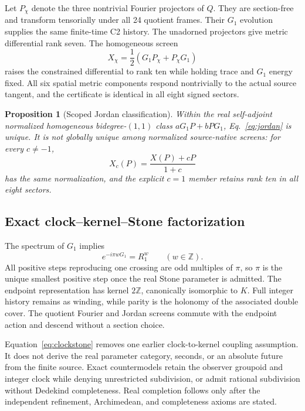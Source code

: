 \documentclass[11pt]{article}
\newtheorem{proposition}[theorem]{Proposition}
\theoremstyle{definition}
\theoremstyle{remark}
\begin{document}
Let $P_\chi$ denote the three nontrivial Fourier projectors of $Q$. They are section-free and transform tensorially under all 24 quotient frames. Their $G_1$ evolution supplies the same finite-time C2 history. The unadorned projectors give metric differential rank seven. The homogeneous screen
\begin{equation}\label{eq:jordan}
 X_\chi=\frac12(G_1P_\chi+P_\chi G_1)
\end{equation}
raises the constrained differential to rank ten while holding trace and $G_1$ energy fixed. All six spatial metric components respond nontrivially to the actual source tangent, and the certificate is identical in all eight signed sectors.

\begin{proposition}[Scoped Jordan classification]\label{prop:jordan}
Within the real self-adjoint normalized homogeneous bidegree-$(1,1)$ class $aG_1P+bPG_1$, Eq.~\eqref{eq:jordan} is unique. It is not globally unique among normalized source-native screens: for every $c\ne-1$,
\begin{equation}
 X_c(P)=\frac{X(P)+cP}{1+c}
\end{equation}
has the same normalization, and the explicit $c=1$ member retains rank ten in all eight sectors.
\end{proposition}

\subsection{Exact clock--kernel--Stone factorization}

The spectrum of $G_1$ implies
\begin{equation}\label{eq:clockstone}
 e^{-i\pi wG_1}=R_1^w\qquad(w\in\mathbb Z).
\end{equation}
All positive steps reproducing one crossing are odd multiples of $\pi$, so $\pi$ is the unique smallest positive step once the real Stone parameter is admitted. The endpoint representation has kernel $2\mathbb Z$, canonically isomorphic to $K$. Full integer history remains as winding, while parity is the holonomy of the associated double cover. The quotient Fourier and Jordan screens commute with the endpoint action and descend without a section choice.

Equation~\eqref{eq:clockstone} removes one earlier clock-to-kernel coupling assumption. It does not derive the real parameter category, seconds, or an absolute future from the finite source. Exact countermodels retain the observer groupoid and integer clock while denying unrestricted subdivision, or admit rational subdivision without Dedekind completeness. Real completion follows only after the independent refinement, Archimedean, and completeness axioms are stated.
\end{document}
